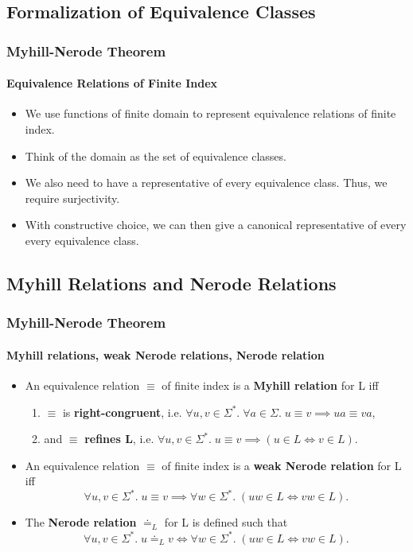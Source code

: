 \documentclass{beamer}
\begin{document}
\subsection{Formalization of Equivalence Classes}
\begin{frame}
    \frametitle{Myhill-Nerode Theorem}
    \framesubtitle{Equivalence Relations of Finite Index}
    \begin{itemize}
        \item We use functions of finite domain to represent equivalence relations of finite index. 
        \item Think of the domain as the set of equivalence classes.
        \item We also need to have a representative of every equivalence class. Thus, we require surjectivity.
        \item With constructive choice, we can then give a canonical representative of every every equivalence class.

    \end{itemize}
\end{frame}

\subsection{Myhill Relations and Nerode Relations}
\begin{frame}
    \frametitle{Myhill-Nerode Theorem}
    \framesubtitle{Myhill relations, weak Nerode relations, Nerode relation}
    \begin{itemize}
        \item An equivalence relation $\equiv$ of finite index is a \textbf{Myhill relation} for L iff
            \begin{enumerate}
                \item $\equiv$ is \textbf{right-congruent}, i.e. $\forall u,v \in \Sigma^*. \; \forall a \in \Sigma. \; u \equiv v \implies ua \equiv va$, 
                \item and $\equiv$ \textbf{refines L}, i.e. $\forall u,v \in \Sigma^*. \; u \equiv v \implies (u \in L \iff v \in L)$.
            \end{enumerate}
        \item An equivalence relation $\equiv$ of finite index is a \textbf{weak Nerode relation} for L iff 
            \begin{equation*}
               \forall u,v \in \Sigma^*. \; u \equiv v \implies \forall w \in \Sigma^*. \; (uw \in L \iff vw \in L).
            \end{equation*}
        \item The \textbf{Nerode relation} $\doteq_L$ for L is defined such that
            \begin{equation*}
               \forall u,v \in \Sigma^*. \; u \doteq_L v \iff \forall w \in \Sigma^*. \; (uw \in L \iff vw \in L).
            \end{equation*}
    \end{itemize}
\end{frame}
\end{document}
